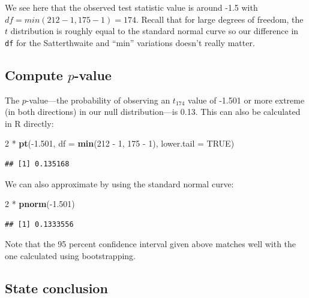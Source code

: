 \documentclass[]{tufte-book}
\newenvironment{Shaded}{\begin{snugshade}}{\end{snugshade}}
\newcommand{\KeywordTok}[1]{\textcolor[rgb]{0.13,0.29,0.53}{\textbf{{#1}}}}
\newcommand{\DataTypeTok}[1]{\textcolor[rgb]{0.13,0.29,0.53}{{#1}}}
\newcommand{\DecValTok}[1]{\textcolor[rgb]{0.00,0.00,0.81}{{#1}}}
\newcommand{\FloatTok}[1]{\textcolor[rgb]{0.00,0.00,0.81}{{#1}}}
\newcommand{\StringTok}[1]{\textcolor[rgb]{0.31,0.60,0.02}{{#1}}}
\newcommand{\OtherTok}[1]{\textcolor[rgb]{0.56,0.35,0.01}{{#1}}}
\newcommand{\NormalTok}[1]{{#1}}
\begin{document}
We see here that the observed test statistic value is around -1.5 with
\(df = min(212 - 1, 175 - 1) = 174\). Recall that for large degrees of
freedom, the \(t\) distribution is roughly equal to the standard normal
curve so our difference in \texttt{df} for the Satterthwaite and ``min''
variations doesn't really matter.

\subsection{\texorpdfstring{Compute
\(p\)-value}{Compute p-value}}\label{compute-p-value-2}

The \(p\)-value---the probability of observing an \(t_{174}\) value of
-1.501 or more extreme (in both directions) in our null
distribution---is 0.13. This can also be calculated in R directly:

\begin{Shaded}
\begin{Highlighting}[]
\DecValTok{2} \NormalTok{*}\StringTok{ }\KeywordTok{pt}\NormalTok{(-}\FloatTok{1.501}\NormalTok{, }\DataTypeTok{df =} \KeywordTok{min}\NormalTok{(}\DecValTok{212} \NormalTok{-}\StringTok{ }\DecValTok{1}\NormalTok{, }\DecValTok{175} \NormalTok{-}\StringTok{ }\DecValTok{1}\NormalTok{), }\DataTypeTok{lower.tail =} \OtherTok{TRUE}\NormalTok{)}
\end{Highlighting}
\end{Shaded}

\begin{verbatim}
## [1] 0.135168
\end{verbatim}

We can also approximate by using the standard normal curve:

\begin{Shaded}
\begin{Highlighting}[]
\DecValTok{2} \NormalTok{*}\StringTok{ }\KeywordTok{pnorm}\NormalTok{(-}\FloatTok{1.501}\NormalTok{)}
\end{Highlighting}
\end{Shaded}

\begin{verbatim}
## [1] 0.1333556
\end{verbatim}

Note that the 95 percent confidence interval given above matches well
with the one calculated using bootstrapping.

\subsection{State conclusion}\label{state-conclusion-3}
\end{document}
